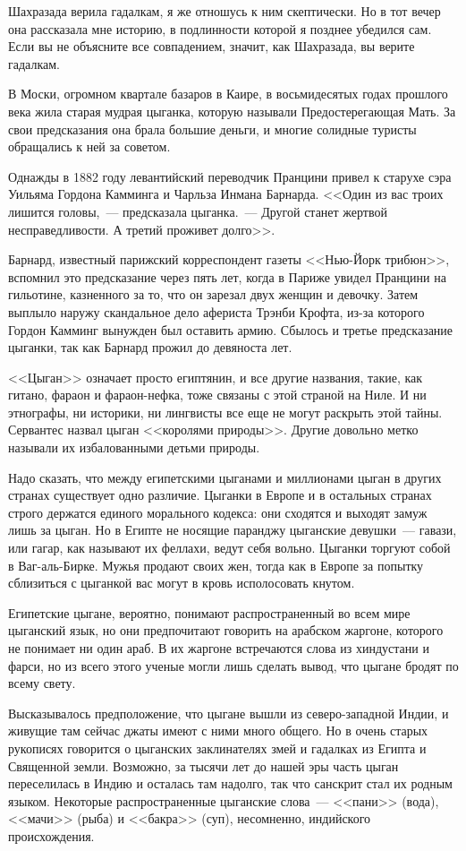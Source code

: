 \documentclass[12pt,a4paper,twoside,openany,svgnames]{memoir}
\begin{document}
Шахразада верила гадалкам, я же отношусь к ним скептически. Но в тот вечер она рассказала мне историю, в подлинности которой я позднее убедился сам. Если вы не объясните все совпадением, значит, как Шахразада, вы верите гадалкам.

В Моски, огромном квартале базаров в Каире, в восьмидесятых годах прошлого века жила старая мудрая цыганка, которую называли Предостерегающая Мать. За свои предсказания она брала большие деньги, и многие солидные туристы обращались к ней за советом.

Однажды в 1882 году левантийский переводчик Пранцини привел к старухе сэра Уильяма Гордона Камминга и Чарльза Инмана Барнарда. <<Один из вас троих лишится головы,~--- предсказала цыганка.~--- Другой станет жертвой несправедливости. А третий проживет долго>>.

Барнард, известный парижский корреспондент газеты <<Нью-Йорк трибюн>>, вспомнил это предсказание через пять лет, когда в Париже увидел Пранцини на гильотине, казненного за то, что он зарезал двух женщин и девочку. Затем выплыло наружу скандальное дело афериста Трэнби Крофта, из-за которого Гордон Камминг вынужден был оставить армию. Сбылось и третье предсказание цыганки, так как Барнард прожил до девяноста лет.

<<Цыган>> означает просто египтянин, и все другие названия, такие, как гитано, фараон и фараон-нефка, тоже связаны с этой страной на Ниле. И ни этнографы, ни историки, ни лингвисты все еще не могут раскрыть этой тайны. Сервантес назвал цыган <<королями природы>>. Другие довольно метко называли их избалованными детьми природы.

Надо сказать, что между египетскими цыганами и миллионами цыган в других странах существует одно различие. Цыганки в Европе и в остальных странах строго держатся единого морального кодекса: они сходятся и выходят замуж лишь за цыган. Но в Египте не носящие паранджу цыганские девушки~--- гавази, или гагар, как называют их феллахи, ведут себя вольно. Цыганки торгуют собой в Ваг-аль-Бирке. Мужья продают своих жен, тогда как в Европе за попытку сблизиться с цыганкой вас могут в кровь исполосовать кнутом.

Египетские цыгане, вероятно, понимают распространенный во всем мире цыганский язык, но они предпочитают говорить на арабском жаргоне, которого не понимает ни один араб. В их жаргоне встречаются слова из хиндустани и фарси, но из всего этого ученые могли лишь сделать вывод, что цыгане бродят по всему свету.

Высказывалось предположение, что цыгане вышли из северо-западной Индии, и живущие там сейчас джаты имеют с ними много общего. Но в очень старых рукописях говорится о цыганских заклинателях змей и гадалках из Египта и Священной земли. Возможно, за тысячи лет до нашей эры часть цыган переселилась в Индию и осталась там надолго, так что санскрит стал их родным языком. Некоторые распространенные цыганские слова~--- <<пани>> (вода), <<мачи>> (рыба) и <<бакра>> (суп), несомненно, индийского происхождения.
\end{document}
